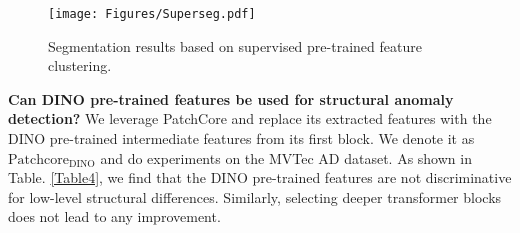 \documentclass[final,5p,times,twocolumn]{elsarticle}
\begin{document}
\begin{figure}
\centering
		\texttt{[image: Figures/Superseg.pdf]}\caption{Segmentation results based on supervised pre-trained feature clustering.}
	\label{FIG:10}
\end{figure}

\textbf{Can DINO pre-trained features be used for structural anomaly detection?} We leverage PatchCore and replace its extracted features with the DINO pre-trained intermediate features from its first block. We denote it as $\mathrm{Patchcore}_{\mathrm{DINO}}$ and do experiments on the MVTec AD dataset. As shown in Table. \ref{Table4}, we find that the DINO pre-trained features are not discriminative for low-level structural differences. Similarly, selecting deeper transformer blocks does not lead to any improvement.  

\begin{table}[]
\caption{Quantitative comparisons of image-level detection results for Patchcore with different pre-trained features on the MVTec AD dataset. (AUROC\%)}
\label{Table4}
\centering
{}
\end{table}
\end{document}
